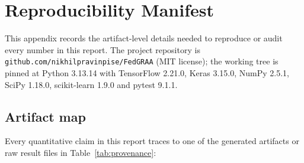\documentclass[11pt,a4paper]{report}
\begin{document}
\appendix
\chapter{Reproducibility Manifest}
\label{app:manifest}

This appendix records the artifact-level details needed to reproduce or
audit every number in this report. The project repository is
\texttt{github.com/nikhilpravinpise/FedGRAA} (MIT license); the working tree is
pinned at Python 3.13.14 with TensorFlow 2.21.0, Keras 3.15.0, NumPy 2.5.1,
SciPy 1.18.0, scikit-learn 1.9.0 and pytest 9.1.1.

\section{Artifact map}
\label{sec:artifact-map}

Every quantitative claim in this report traces to one of the generated
artifacts or raw result files in Table~\ref{tab:provenance}:
\end{document}
